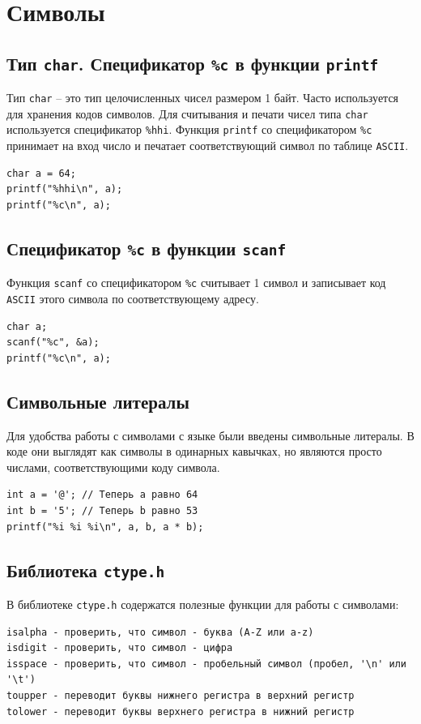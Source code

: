 \documentclass{article}
\begin{document}
\section*{Символы}
\subsection*{Тип \texttt{char}. Спецификатор \texttt{\%c} в функции \texttt{printf}}
Тип \texttt{char} -- это тип целочисленных чисел размером 1 байт. Часто используется для хранения кодов символов.
Для считывания и печати чисел типа \texttt{char} используется спецификатор \texttt{\%hhi}.
Функция \texttt{printf} со спецификатором \texttt{\%c} принимает на вход число и печатает соответствующий символ по таблице \texttt{ASCII}.
\begin{lstlisting}
char a = 64;
printf("%hhi\n", a);
printf("%c\n", a);
\end{lstlisting}

\subsection*{Спецификатор \texttt{\%c} в функции \texttt{scanf}}
Функция \texttt{scanf} со спецификатором \texttt{\%c} считывает 1 символ и записывает код \texttt{ASCII} этого символа по соответствующему адресу.
\begin{lstlisting}
char a; 
scanf("%c", &a);
printf("%c\n", a);
\end{lstlisting}


\subsection*{Символьные литералы}
Для удобства работы с символами с языке были введены символьные литералы. В коде они выглядят как символы в одинарных кавычках, но являются просто числами, соответствующими коду символа.
\begin{lstlisting}
int a = '@'; // Теперь a равно 64
int b = '5'; // Теперь b равно 53
printf("%i %i %i\n", a, b, a * b);
\end{lstlisting}

\subsection*{Библиотека \texttt{ctype.h}}
В библиотеке \texttt{ctype.h} содержатся полезные функции для работы с символами:
\begin{verbatim}
isalpha - проверить, что символ - буква (A-Z или a-z)
isdigit - проверить, что символ - цифра
isspace - проверить, что символ - пробельный символ (пробел, '\n' или '\t')
toupper - переводит буквы нижнего регистра в верхний регистр
tolower - переводит буквы верхнего регистра в нижний регистр
\end{verbatim}
\end{document}
